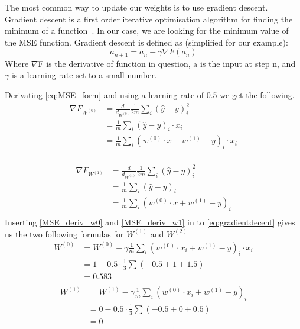 The most common way to update our weights is to use gradient descent. 
Gradient descent is a first order iterative optimisation algorithm for finding the minimum of a function~\cite{robbins1951}. In our case, we are looking for the minimum value of the MSE function. Gradient descent is defined as (simplified for our example):
\begin{equation}
    a_{n+1}= a_{n} - \gamma \nabla F(a_{n})
    \label{eq:gradientdecent}
\end{equation}
Where $\nabla$F is the derivative of function in question, a is the input at step n, and $\gamma$ is a learning rate set to a small number. 

Derivating \ref{eq:MSE_form} and using a learning rate of 0.5 we get the following. 
\begin{equation}
    \label{MSE_deriv_w0}
    \begin{split}
    \nabla F_{W^{(0)}} &= \frac{d}{d_{W^{(0)}} } \frac{1}{2m} \sum_i (\hat{y}-y)_i^2 \\
     &= \frac{1}{m} \sum_{i}{(\hat{y}-y)}_{i} \cdot x_i\\
     &= \frac{1}{m} \sum_{i}{(w^{(0)} \cdot x + w^{(1)}-y)}_{i} \cdot x_i\\
    \end{split}
\end{equation}

\begin{equation}
    \label{MSE_deriv_w1}
    \begin{split}
     \nabla F_{W^{(1)}} &= \frac{d}{d_{W^{(1)}} } \frac{1}{2m} \sum_i (\hat{y}-y)_i^2 \\
                    &= \frac{1}{m} \sum_{i}{(\hat{y}-y)}_{i} \\
                    &= \frac{1}{m} \sum_{i}{(w^{(0)} \cdot x + w^{(1)}-y)}_{i}\\
    \end{split}
\end{equation}
Inserting \ref{MSE_deriv_w0} and \ref{MSE_deriv_w1} in to \ref{eq:gradientdecent} gives us the two following formulas for $W^{(1)}$ and $W^{(2)}$
\begin{equation}
    \label{GD_W0}
    \begin{split}
    W^{(0)}  &= W^{(0)} - \gamma \frac{1}{m} \sum_{i}{(w^{(0)} \cdot x_i + w^{(1)}-y)}_{i} \cdot x_i \\
              &= 1 - 0.5 \cdot \frac{1}{3}  \sum (-0.5+1+1.5)  \\
              &= 0.583\\
    \end{split}
\end{equation}
\begin{equation}
    \label{GD_W0}
    \begin{split}
    W^{(1)}  &= W^{(1)} - \gamma \frac{1}{m} \sum_{i}{(w^{(0)} \cdot x_i + w^{(1)}-y)}_{i} \\
              &= 0 - 0.5 \cdot \frac{1}{3} \sum (-0.5+0+0.5) \\
              &= 0\\
    \end{split}
\end{equation}

